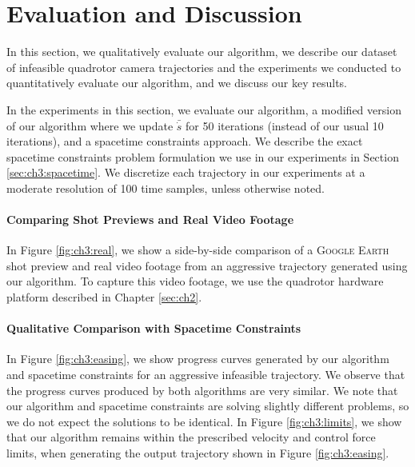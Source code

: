 \section{Evaluation and Discussion}
\label{sec:ch3:results}

In this section, we qualitatively evaluate our algorithm, we describe our dataset of infeasible quadrotor camera trajectories and the experiments we conducted to quantitatively evaluate our algorithm, and we discuss our key results.

In the experiments in this section, we evaluate our algorithm, a modified version of our algorithm where we update $\bar{\dot{s}}$ for 50 iterations (instead of our usual 10 iterations), and a spacetime constraints approach.
We describe the exact spacetime constraints problem formulation we use in our experiments in Section \ref{sec:ch3:spacetime}.
We discretize each trajectory in our experiments at a moderate resolution of 100 time samples, unless otherwise noted.

\paragraph{Comparing Shot Previews and Real Video Footage}

In Figure \ref{fig:ch3:real}, we show a side-by-side comparison of a \textsc{Google Earth} shot preview and real video footage from an aggressive trajectory generated using our algorithm.
To capture this video footage, we use the quadrotor hardware platform described in Chapter \ref{sec:ch2}.

\paragraph{Qualitative Comparison with Spacetime Constraints}


In Figure \ref{fig:ch3:easing}, we show progress curves generated by our algorithm and spacetime constraints for an aggressive infeasible trajectory.
We observe that the progress curves produced by both algorithms are very similar.
We note that our algorithm and spacetime constraints are solving slightly different problems, so we do not expect the solutions to be identical.
In Figure \ref{fig:ch3:limits}, we show that our algorithm remains within the prescribed velocity and control force limits, when generating the output trajectory shown in Figure \ref{fig:ch3:easing}.

